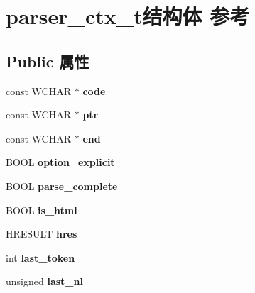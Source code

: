 \hypertarget{structparser__ctx__t}{}\section{parser\+\_\+ctx\+\_\+t结构体 参考}
\label{structparser__ctx__t}
\subsection*{Public 属性}
\begin{DoxyCompactItemize}
\item 
\mbox{\label{structparser__ctx__t_aa84475a31b5a077d00defea18e51048f}} 
const W\+C\+H\+AR $\ast$ {\bfseries code}
\item 
\mbox{\label{structparser__ctx__t_a540969c9b10a12c098c3b0ea8b5dd22a}} 
const W\+C\+H\+AR $\ast$ {\bfseries ptr}
\item 
\mbox{\label{structparser__ctx__t_a175ba8aaf85ce346b684dbb241a81fe3}} 
const W\+C\+H\+AR $\ast$ {\bfseries end}
\item 
\mbox{\label{structparser__ctx__t_af19838da2de0132f1330269519be4fe1}} 
B\+O\+OL {\bfseries option\+\_\+explicit}
\item 
\mbox{\label{structparser__ctx__t_a003317d5d13ec0a66576ab1e8023b1a9}} 
B\+O\+OL {\bfseries parse\+\_\+complete}
\item 
\mbox{\label{structparser__ctx__t_adedf2b694f9c075b7c65d6ec3c1e929a}} 
B\+O\+OL {\bfseries is\+\_\+html}
\item 
\mbox{\label{structparser__ctx__t_a8172f64019797966e872ccaa316b7258}} 
H\+R\+E\+S\+U\+LT {\bfseries hres}
\item 
\mbox{\label{structparser__ctx__t_a040257fbd854c223aef8568e41e22d8a}} 
int {\bfseries last\+\_\+token}
\item 
\mbox{\label{structparser__ctx__t_a81ed5d3b35479dbdf0f72662d51bdf15}} 
unsigned {\bfseries last\+\_\+nl}
\item 

\end{DoxyCompactItemize}
